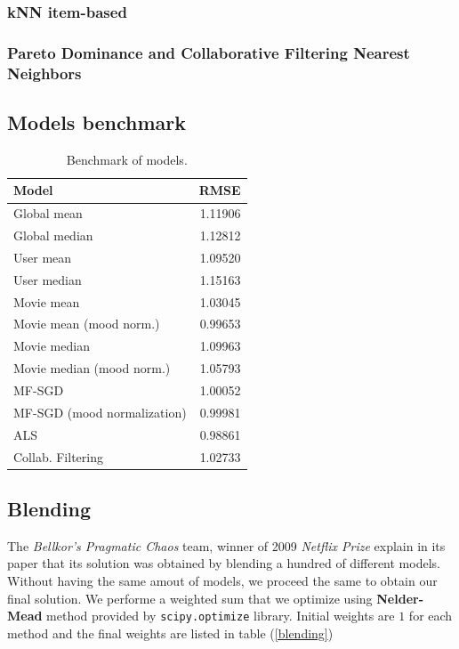 \documentclass[10pt,conference,compsocconf]{IEEEtran}
\begin{document}
\subsubsection{kNN item-based}
\subsubsection{Pareto Dominance and Collaborative Filtering Nearest Neighbors}

\subsection{Models benchmark}
\label{sec:model_bench}

\begin{table}[htbp]
\centering
\begin{tabular}[c]{| l r |}
\hline
Model & RMSE \\
\hline 
\hline
Global mean					& 1.11906	\\
Global median 					& 1.12812	\\
User mean 					& 1.09520 \\
User median					& 1.15163 \\
Movie mean					& 1.03045 \\
Movie mean (mood norm.)		& 0.99653 \\
Movie median					& 1.09963 \\
Movie median (mood norm.)		& 1.05793 \\
MF-SGD 						& 1.00052 \\
MF-SGD (mood normalization) 		& 0.99981 \\
ALS							& 0.98861 \\
Collab. Filtering					& 1.02733 \\
\hline


\end{tabular}
  \caption{Benchmark of models.}
  \label{benchmark}
\end{table}




\subsection{Blending}

The \textit{Bellkor's Pragmatic Chaos} team, winner of 2009 \textit{Netflix Prize} explain in its paper that its solution was obtained by blending a hundred of different models. \cite{BellKore_netflix} Without having the same amout of models, we proceed the same to obtain our final solution. We performe a weighted sum that we optimize using \textbf{Nelder-Mead} method provided by \texttt{scipy.optimize} library. Initial weights are $1$ for each method and the final weights are listed in table (\ref{blending})
\end{document}
